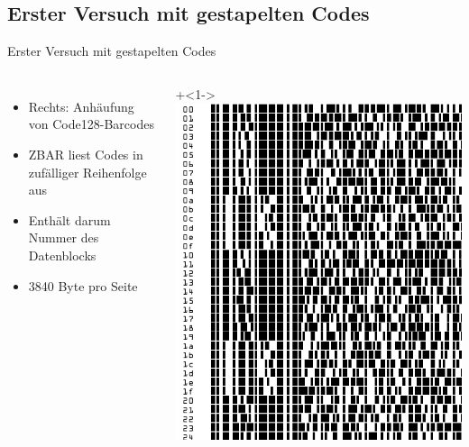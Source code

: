\subsection{Erster Versuch mit gestapelten Codes}
\begin{frame}{Erster Versuch mit gestapelten Codes}
	\begin{columns}
		\begin{itemize}
		\item<2-> Rechts: Anhäufung von Code128-Barcodes
		\item<3-> ZBAR liest Codes in zufälliger Reihenfolge aus
		\item<4-> Enthält darum Nummer des Datenblocks
		\item<5-> 3840 Byte pro Seite
		\end{itemize}
		\onslide+<1->\includegraphics[width=\textwidth]{penma/outputs/simple_stack.png}
	\end{columns}
\end{frame}

